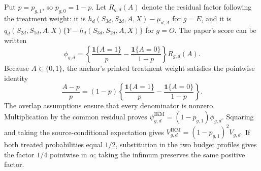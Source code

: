 Put \(p=p_{g,1}\), so \(p_{g,0}=1-p\).  Let \(R_{g,d}(A)\) denote the residual factor following the treatment weight: it is \(h_d(S_{3d},S_{2d},A,X)-\mu_{d,A}\) for \(g=E\), and it is \(q_d(S_{2d},S_{1d},A,X)\{Y-h_d(S_{3d},S_{2d},A,X)\}\) for \(g=O\).  The paper's score can be written
\[
 \phi_{g,d}
 =\left\{\frac{\mathbf 1\{A=1\}}p
 -\frac{\mathbf 1\{A=0\}}{1-p}\right\}R_{g,d}(A).
\]
Because \(A\in\{0,1\}\), the anchor's printed treatment weight satisfies the pointwise identity
\[
 \frac{A-p}{p}
 =(1-p)\left\{\frac{\mathbf 1\{A=1\}}p
 -\frac{\mathbf 1\{A=0\}}{1-p}\right\}.
\]
The overlap assumptions ensure that every denominator is nonzero. Multiplication by the common residual proves \(\psi_{g,d}^{\mathrm{IKM}}=(1-p_{g,1})\phi_{g,d}\). Squaring and taking the source-conditional expectation gives \(V_{g,d}^{\mathrm{IKM}}=(1-p_{g,1})^2V_{g,d}\). If both treated probabilities equal \(1/2\), substitution in the two budget profiles gives the factor \(1/4\) pointwise in \(\alpha\); taking the infimum preserves the same positive factor.